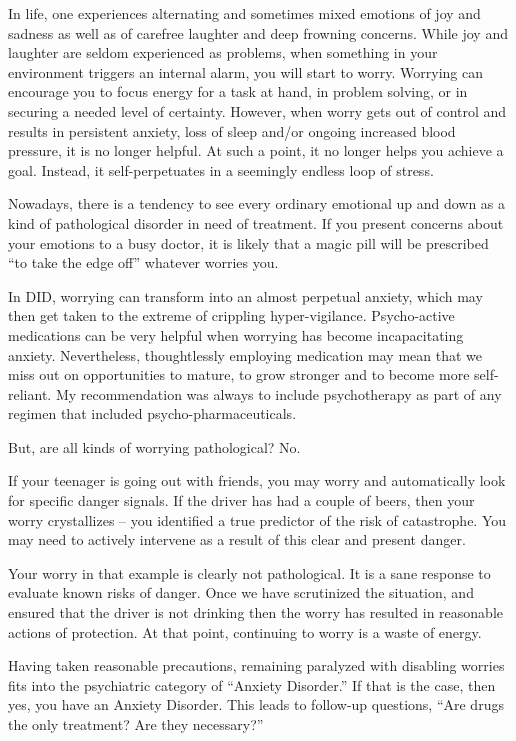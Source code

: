 \documentclass[]{book}
\begin{document}
In life, one experiences alternating and sometimes mixed emotions of joy and sadness as well as of carefree laughter and deep frowning concerns. While joy and laughter are seldom experienced as problems, when something in your environment triggers an internal alarm, you will start to worry. Worrying can encourage you to focus energy for a task at hand, in problem solving, or in securing a needed level of certainty. However, when worry gets out of control and results in persistent anxiety, loss of sleep and/or ongoing increased blood pressure, it is no longer helpful. At such a point, it no longer helps you achieve a goal. Instead, it self-perpetuates in a seemingly endless loop of stress.

Nowadays, there is a tendency to see every ordinary emotional up and down as a kind of pathological disorder in need of treatment. If you present concerns about your emotions to a busy doctor, it is likely that a magic pill will be prescribed ``to take the edge off'' whatever worries you.

In DID, worrying can transform into an almost perpetual anxiety, which may then get taken to the extreme of crippling hyper-vigilance. Psycho-active medications can be very helpful when worrying has become incapacitating anxiety. Nevertheless, thoughtlessly employing medication may mean that we miss out on opportunities to mature, to grow stronger and to become more self-reliant. My recommendation was always to include psychotherapy as part of any regimen that included psycho-pharmaceuticals.

But, are all kinds of worrying pathological? No.

If your teenager is going out with friends, you may worry and automatically look for specific danger signals. If the driver has had a couple of beers, then your worry crystallizes -- you identified a true predictor of the risk of catastrophe. You may need to actively intervene as a result of this clear and present danger.

Your worry in that example is clearly not pathological. It is a sane response to evaluate known risks of danger. Once we have scrutinized the situation, and ensured that the driver is not drinking then the worry has resulted in reasonable actions of protection. At that point, continuing to worry is a waste of energy.

Having taken reasonable precautions, remaining paralyzed with disabling worries fits into the psychiatric category of ``Anxiety Disorder.'' If that is the case, then yes, you have an Anxiety Disorder. This leads to follow-up questions, ``Are drugs the only treatment? Are they necessary?''
\end{document}
